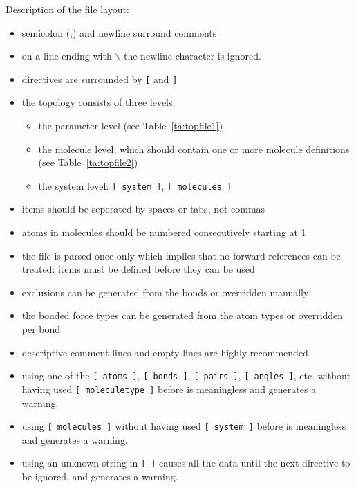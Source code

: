 Description of the file layout:
\begin{itemize}
\item semicolon (;) and newline surround comments
\item on a line ending with $\backslash$ the newline character is ignored.
\item directives are surrounded by \verb'[' and \verb']'
\item the topology consists of three levels:
\begin{itemize}
\item the parameter level (see Table~\ref{ta:topfile1})
\item the molecule level, which should contain one or more molecule
      definitions (see Table~\ref{ta:topfile2})
\item the system level: \verb'[ system ]', \verb'[ molecules ]'
\end{itemize}
\item items should be seperated by spaces or tabs, not commas
\item atoms in molecules should be numbered consecutively starting at 1
\item the file is parsed once only which implies that no forward
      references can be treated: items must be defined before they
      can be used
\item exclusions can be generated from the bonds or
      overridden manually
\item the bonded force types can be generated from the atom types or
      overridden per bond
\item descriptive comment lines and empty lines are highly recommended
\item using one of the \verb'[ atoms ]', \verb'[ bonds ]', 
      \verb'[ pairs ]', \verb'[ angles ]', etc. without having used 
      \verb'[ moleculetype ]' 
      before is meaningless and generates a warning.
\item using \verb'[ molecules ]' without having used
      \verb'[ system ]' before is meaningless and generates a warning.
\item using an unknown string in \verb'[ ]' causes all the data until
      the next directive to be ignored, and generates a warning.
\end{itemize}

